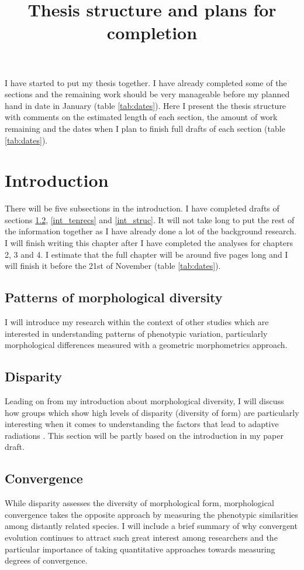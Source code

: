 \documentclass[12pt,a4paper]{article}
\begin{document}
\title{Thesis structure and plans for completion}
\author{}
\date{}
\maketitle


	I have started to put my thesis together. I have already completed some of the sections and the remaining work should be very manageable before my planned hand in date in January (table \ref{tab:dates}). Here I present the thesis structure with comments on the estimated length of each section, the amount of work remaining and the dates when I plan to finish full drafts of each section (table \ref{tab:dates}). 

\section{Introduction}
	There will be five subsections in the introduction. I have completed drafts of sections \ref{int_disp}, \ref{int_tenrecs} and \ref*{int_struc}. It will not take long to put the rest of the information together as I have already done a lot of the background research. I will finish writing this chapter after I have completed the analyses for chapters 2, 3 and 4. I estimate that the full chapter will be around five pages long and I will finish it before the 21st of November (table \ref{tab:dates}).


	\subsection{Patterns of morphological diversity}
		I will introduce my research within the context of other studies which are interested in understanding patterns of phenotypic variation, particularly morphological differences measured with a geometric morphometrics approach. 

	\subsection{Disparity}
		\label{int_disp}
		Leading on from my introduction about morphological diversity, I will discuss how groups which show high levels of disparity (diversity of form) are particularly interesting when it comes to understanding the factors that lead to adaptive radiations \citep{Losos2010a}. This section will be partly based on the introduction in my paper draft.  
		
	\subsection{Convergence}
		\label{int_conv}
		While disparity assesses the diversity of morphological form, morphological convergence takes the opposite approach by measuring the phenotypic similarities among distantly related species. I will include a brief summary of why convergent evolution continues to attract such great interest among researchers and the particular importance of taking quantitative approaches towards measuring degrees of convergence.
	
\end{document}
